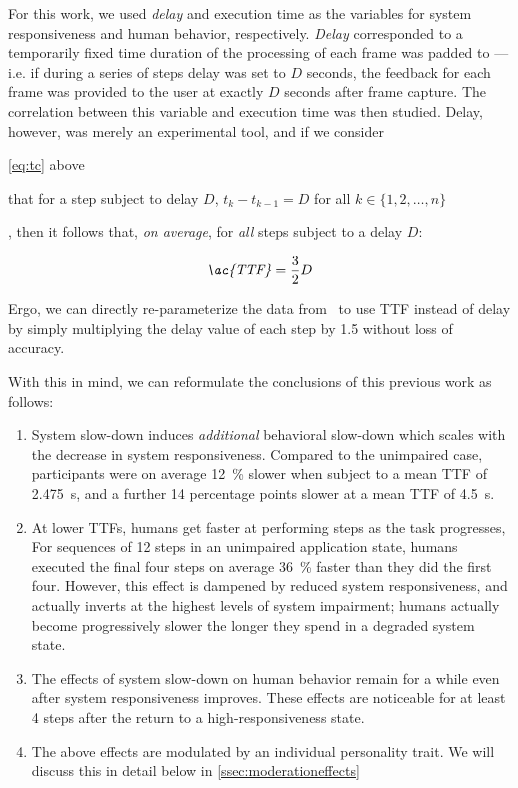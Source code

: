 For this work, we used \emph{delay} and execution time as the variables for system responsiveness and human behavior, respectively.
\emph{Delay} corresponded to a temporarily fixed time duration of the processing of each frame was padded to --- i.e. if during a series of steps delay was set to \( D \) seconds, the feedback for each frame was provided to the user at exactly \( D \) seconds after frame capture.
The correlation between this variable and execution time was then studied.
Delay, however, was merely an experimental tool, and if we consider
\begin{enumerate*}[itemjoin={{; }}, itemjoin={{; and }}]
    \item \cref{eq:tc} above
    \item that for a step subject to delay \( D \), \( t_k - t_{k - 1} = D \) for all \( k \in \{1, 2, \ldots, n\} \)
\end{enumerate*},
then it follows that, \emph{on average}, for \emph{all} steps subject to a delay \( D \):

\begin{align}\label{eq:ttf}
    \text{\emph{\ac{TTF}}} = \frac{3}{2}D
\end{align}

Ergo, we can directly re-parameterize the data from~\cite{olguinmunoz:impact2021} to use \ac{TTF} instead of delay by simply multiplying the delay value of each step by \num{1.5} without loss of accuracy.

With this in mind, we can reformulate the conclusions of this previous work as follows:
\begin{enumerate}
    \item System slow-down induces \emph{additional} behavioral slow-down which scales with the decrease in system responsiveness.
    Compared to the unimpaired case, participants were on average \SI{12}{\percent} slower when subject to a mean \ac{TTF} of \SI{2.475}{\second}, and a further \num{14} percentage points slower at a mean \ac{TTF} of \SI{4.5}{\second}.

    \item\label{item:speedup} At lower \acp{TTF}, humans get faster at performing steps as the task progresses, 
    For sequences of \num{12} steps in an unimpaired application state, humans executed the final four steps on average \SI{36}{\percent} faster than they did the first four.
    However, this effect is dampened by reduced system responsiveness, and actually inverts at the highest levels of system impairment; humans actually become progressively slower the longer they spend in a degraded system state.

    \item\label{item:remain} The effects of system slow-down on human behavior remain for a while even after system responsiveness improves.
    These effects are noticeable for at least \num{4} steps after the return to a high-responsiveness state. 
    
    \item The above effects are modulated by an individual personality trait.
    We will discuss this in detail below in \cref{ssec:moderationeffects}
\end{enumerate}

